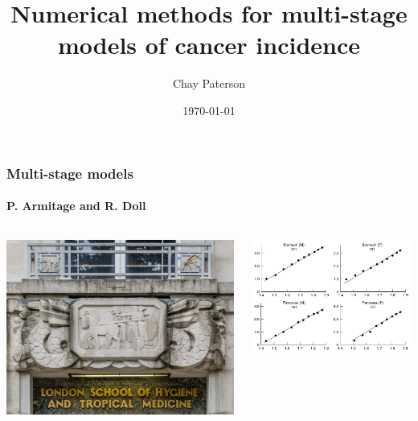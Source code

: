 \documentclass{beamer}
\title{Numerical methods for multi-stage models of cancer incidence}
\author{Chay Paterson}
\institute{University of Manchester}
\date{\today}
\begin{document}
\frame{\titlepage}

\begin{frame}
    \frametitle{Multi-stage models}
    \framesubtitle{P. Armitage and R. Doll\footnotemark[12]}

    \begin{columns}
        \begin{column}{0.5\textwidth}
        \includegraphics[width=\textwidth]{figures/LSHTM-small.jpg}
        \end{column}
        \begin{column}{0.5\textwidth}
        \includegraphics[width=\textwidth]{figures/PArmitageRDoll_1954_6602297.pdf}
        \end{column}
    \end{columns}


\end{frame}
\end{document}
